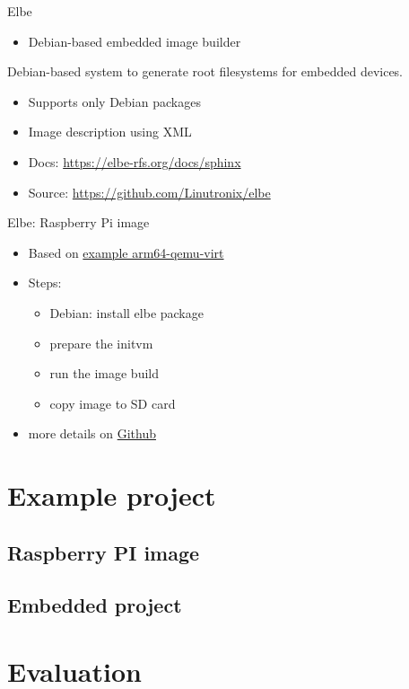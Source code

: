 \documentclass{beamer}
\begin{document}
\begin{frame}{Elbe}
	\begin{itemize}
		\item Debian-based embedded image builder
	\end{itemize}
	\begin{definition} 
		Debian-based system to generate root filesystems for embedded devices.
	\end{definition}
	\begin{itemize}
		\item Supports only Debian packages
		\item Image description using XML
		\item Docs: \url{https://elbe-rfs.org/docs/sphinx}
		\item Source: \url{https://github.com/Linutronix/elbe}
	\end{itemize}
\end{frame}

\begin{frame}{Elbe: Raspberry Pi image}
	\begin{itemize}
		\item Based on \href{https://github.com/Linutronix/elbe/blob/master/examples/arm64-qemu-virt.xml}{example arm64-qemu-virt}
		\item Steps:
		\begin{itemize}
			\item Debian: install elbe package
			\item prepare the initvm
			\item run the image build
			\item copy image to SD card
		\end{itemize}
		\item more details on \href{https://github.com/tomirgang/eh21_maintainable_linux/tree/main/examples/first_build_rpi4/elbe}{Github}
	\end{itemize}
\end{frame}

\section{Example project}

\subsection{Raspberry PI image}


\subsection{Embedded project}


\section{Evaluation}





\end{document}
